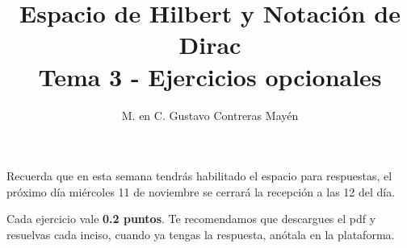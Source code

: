 
\usepackage{apacite}
\geometry{top=1.25cm, bottom=1.5cm, left=1.25cm, right=1.25cm}
\title{Espacio de Hilbert y Notación de Dirac \\[0.3em]  \large{Tema 3 - Ejercicios opcionales}\vspace{-3ex}}
\author{M. en C. Gustavo Contreras Mayén}
\date{ }

\vspace{-4cm}
\maketitle
\fontsize{14}{14}\selectfont
Recuerda que en esta semana tendrás habilitado el espacio para respuestas, el próximo día miércoles 11 de noviembre se cerrará la recepción a las 12 del día.
\par
Cada ejercicio vale \textbf{0.2 puntos}. Te recomendamos que descargues el pdf y resuelvas cada inciso, cuando ya tengas la respuesta, anótala en la plataforma.

